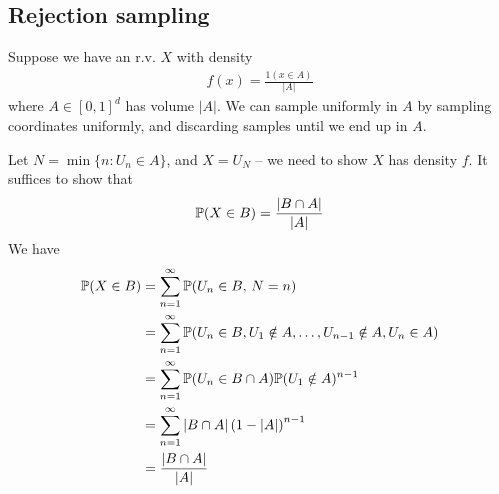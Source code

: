 \documentclass{../template/note}
\begin{document}
    \subsection{Rejection sampling}

    Suppose we have an r.v. \(X\) with density
    \begin{align*}
        f(x) = \frac{1(x \in A)}{|A|}
    \end{align*}
    where \(A \in [0,1]^d\) has volume \(|A|\). We can sample uniformly in \(A\) by sampling coordinates uniformly, and discarding samples until we end up in \(A\).

    Let \(N = \min\{n: U_n \in A\}\), and \(X = U_N\) -- we need to show \(X\) has density \(f\). It suffices to show that
    \begin{align*}
        \mathbb P(X \in B) = \frac{|B \cap A|}{|A|}
    \end{align*}
    We have
    \begin{align*}
        \mathbb P(X \in B) &= \sum_{n=1}^\infty \mathbb P(U_n \in B,\, N = n) \\
        &= \sum_{n=1}^\infty \mathbb P(U_n \in B, U_1 \notin A, \dots, U_{n-1} \notin A, U_n \in A) \\
        &= \sum_{n=1}^\infty \mathbb P(U_n \in B \cap A) \mathbb P(U_1 \notin A)^{n-1} \\
        &= \sum_{n=1}^\infty |B \cap A| \left(1-|A|\right)^{n-1} \\
        &= \frac{|B \cap A|}{|A|}
    \end{align*}
    
    
    
    
     
    
    
    
    
    
    
\end{document}

